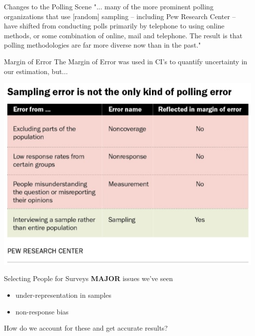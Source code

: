 \documentclass{beamer}
\begin{document}
\begin{frame}{Changes to the Polling Scene}
"... many of the more prominent polling organizations that use [random] sampling – including Pew Research Center – have shifted from conducting polls primarily by telephone to using online methods, or some combination of online, mail and telephone. The result is that polling methodologies are far more diverse now than in the past."
\end{frame}

\begin{frame}{Margin of Error}
The Margin of Error was used in CI's to quantify uncertainty in our estimation, but...

\begin{center}
\includegraphics[scale=.8]{img/sampling_error_chart.jpg}
\end{center}
\end{frame}

\begin{frame}{Selecting People for Surveys}
\textbf{MAJOR} issues we've seen
\begin{itemize}
    \item under-representation in samples
    \item non-response bias
\end{itemize} \vspace{10mm}

How do we account for these and get accurate results?
\end{frame}
\end{document}
